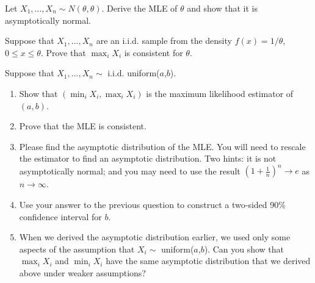 \begin{hw}
  Let $X_1,...,X_n \sim N(\theta, \theta)$. Derive the MLE of
  $\theta$ and show that it is asymptotically normal.
\end{hw}

\begin{hw}
  Suppose that $X_1,...,X_n$ are an i.i.d. sample from the density
  $f(x) = 1/\theta$, $0 \leq x \leq \theta$. Prove that $\max_i X_i$
  is consistent for $\theta$.
\end{hw}

\begin{hw}
  Suppose that $X_1,...,X_n \sim$ i.i.d. uniform($a$,$b$).
  \begin{enumerate}
  \item Show that $(\min_i X_i, \max_i X_i)$ is the maximum likelihood
    estimator of $(a,b)$.
  \item Prove that the MLE is consistent.
  \item Please find the asymptotic distribution of the MLE. You will
    need to rescale the estimator to find an asymptotic distribution.
    Two hints: it is not asymptotically normal; and you may need to
    use the result $(1 + \tfrac{1}{n})^n \to e$ as $n \to \infty$.
  \item Use your answer to the previous question to construct a
    two-sided 90\% confidence interval for $b$.
  \item When we derived the asymptotic distribution earlier, we used
    only some aspects of the assumption that $X_i \sim$
    uniform($a$,$b$). Can you show that $\max_i X_i$ and $\min_i X_i$
    have the same asymptotic distribution that we derived above under
    weaker assumptions?
  \end{enumerate}
\end{hw}

